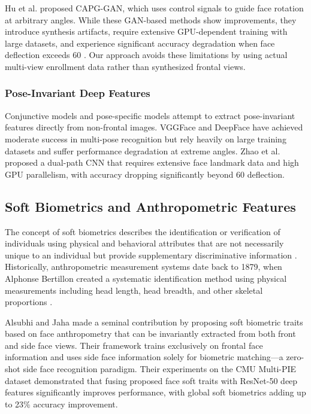 \documentclass[conference]{IEEEtran}
\begin{document}
Hu et al. \cite{b6} proposed CAPG-GAN, which uses control signals to guide face rotation at arbitrary angles. While these GAN-based methods show improvements, they introduce synthesis artifacts, require extensive GPU-dependent training with large datasets, and experience significant accuracy degradation when face deflection exceeds 60\textdegree{} \cite{b3}. Our approach avoids these limitations by using actual multi-view enrollment data rather than synthesized frontal views.

\subsubsection{Pose-Invariant Deep Features}
Conjunctive models \cite{b16} and pose-specific models \cite{b17} attempt to extract pose-invariant features directly from non-frontal images. VGGFace \cite{b18} and DeepFace \cite{b10} have achieved moderate success in multi-pose recognition but rely heavily on large training datasets and suffer performance degradation at extreme angles. Zhao et al. \cite{b19} proposed a dual-path CNN that requires extensive face landmark data and high GPU parallelism, with accuracy dropping significantly beyond 60\textdegree{} deflection.

\subsection{Soft Biometrics and Anthropometric Features}

The concept of soft biometrics describes the identification or verification of individuals using physical and behavioral attributes that are not necessarily unique to an individual but provide supplementary discriminative information \cite{b4}. Historically, anthropometric measurement systems date back to 1879, when Alphonse Bertillon created a systematic identification method using physical measurements including head length, head breadth, and other skeletal proportions \cite{b20}.

Alsubhi and Jaha \cite{b4} made a seminal contribution by proposing soft biometric traits based on face anthropometry that can be invariantly extracted from both front and side face views. Their framework trains exclusively on frontal face information and uses side face information solely for biometric matching---a zero-shot side face recognition paradigm. Their experiments on the CMU Multi-PIE dataset demonstrated that fusing proposed face soft traits with ResNet-50 deep features significantly improves performance, with global soft biometrics adding up to 23\% accuracy improvement.
\end{document}
